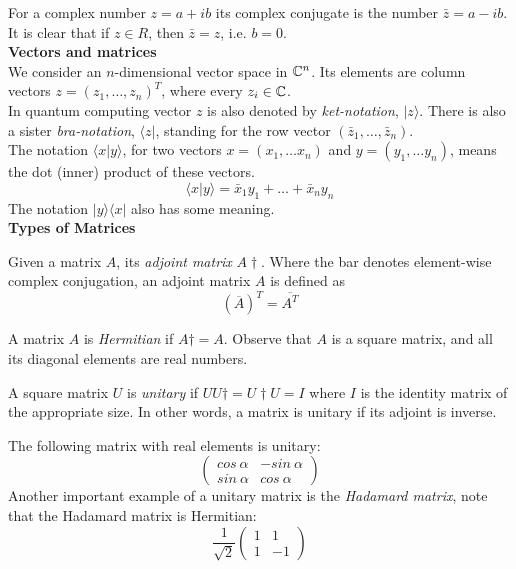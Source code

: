 For a complex number $z = a + ib$ its complex conjugate is the number $\bar{z} = a − ib$.
It is clear that if $z \in R$, then $\bar{z} = z$, i.e. $b = 0$.\\

\textbf{Vectors and matrices}\\
We consider an $n$-dimensional vector space in $\mathbb{C}^n$.
Its elements are column vectors $z = (z_1,\dots,z_n)^T$,
where every $z_i \in \mathbb{C}$.\\

In quantum computing vector $z$ is also denoted by \textit{ket-notation}, $|z\rangle$.
There is also a sister \textit{bra-notation}, $\langle z|$,
standing for the row vector $(\bar{z}_1, \dots , \bar{z}_n)$.\\

The notation $\langle x|y \rangle$,
for two vectors $x = (x_1, \dots x_n)$ and $y = (y_1, \dots y_n)$,
means the dot (inner) product of these vectors.
$$\langle x|y \rangle = \bar{x}_1y_1 + \dots + \bar{x}_ny_n$$
The notation $|y\rangle\langle x|$ also has some meaning.\\

\textbf{Types of Matrices}
\begin{definition}
    Given a matrix $A$, its \textit{adjoint matrix} $A\dagger$.
    Where the bar denotes element-wise complex conjugation,
    an adjoint matrix $A$ is defined as
    $$(\overline{A})^T = \overline{A^T}$$
\end{definition}
\begin{definition}
    A matrix $A$ is \textit{Hermitian} if $A\dagger = A$.
    Observe that $A$ is a square matrix,
    and all its diagonal elements are real numbers.
\end{definition}
\begin{definition}
    A square matrix $U$ is \textit{unitary} if
    $UU\dagger = U\dagger U = I$
    where $I$ is the identity matrix of the appropriate size.
    In other words, a matrix is unitary if its adjoint is inverse.
\end{definition}

\begin{example}
    The following matrix with real elements is unitary:
    $$ \begin{pmatrix}
        cos\ \alpha & -sin\ \alpha  \\
        sin\ \alpha & cos\ \alpha
    \end{pmatrix}
    $$
    Another important example of a unitary matrix is the \textit{Hadamard matrix},
    note that the Hadamard matrix is Hermitian:
    $$
    \frac{1}{\sqrt{2}}
    \begin{pmatrix}
        1 & 1  \\
        1 & -1
    \end{pmatrix}
    $$
\end{example}

